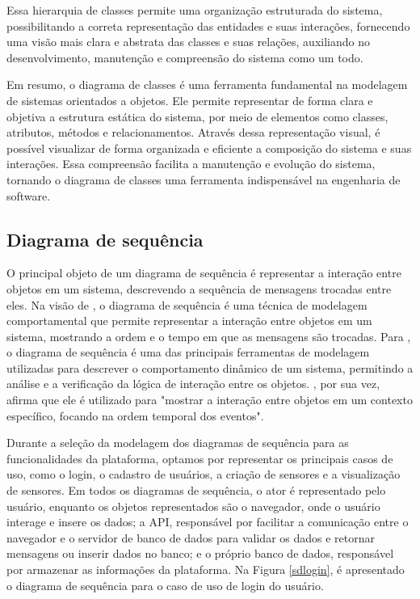 \documentclass[tcc,capa]{texufpel}
\begin{document}
Essa hierarquia de classes permite uma organização estruturada do sistema, possibilitando a correta representação das entidades e suas interações, fornecendo uma visão mais clara e abstrata das classes e suas relações, auxiliando no desenvolvimento, manutenção e compreensão do sistema como um todo.

Em resumo, o diagrama de classes é uma ferramenta fundamental na modelagem de sistemas orientados a objetos. Ele permite representar de forma clara e objetiva a estrutura estática do sistema, por meio de elementos como classes, atributos, métodos e relacionamentos. Através dessa representação visual, é possível visualizar de forma organizada e eficiente a composição do sistema e suas interações. Essa compreensão facilita a manutenção e evolução do sistema, tornando o diagrama de classes uma ferramenta indispensável na engenharia de software.


\subsection{Diagrama de sequência}
O principal objeto de um diagrama de sequência é representar a interação entre objetos em um sistema, descrevendo a sequência de mensagens trocadas entre eles. Na visão de \citet{PRESSMAN:2016}, o diagrama de sequência é uma técnica de modelagem comportamental que permite representar a interação entre objetos em um sistema, mostrando a ordem e o tempo em que as mensagens são trocadas. Para \citet{SOMMERVILLE:2011}, o diagrama de sequência é uma das principais ferramentas de modelagem utilizadas para descrever o comportamento dinâmico de um sistema, permitindo a análise e a verificação da lógica de interação entre os objetos. \citet{LARMAN:2011}, por sua vez, afirma que ele é utilizado para "mostrar a interação entre objetos em um contexto específico, focando na ordem temporal dos eventos".

Durante a seleção da modelagem dos diagramas de sequência para as funcionalidades da plataforma, optamos por representar os principais casos de uso, como o login, o cadastro de usuários, a criação de sensores e a visualização de sensores. Em todos os diagramas de sequência, o ator é representado pelo usuário, enquanto os objetos representados são o navegador, onde o usuário interage e insere os dados; a API, responsável por facilitar a comunicação entre o navegador e o servidor de banco de dados para validar os dados e retornar mensagens ou inserir dados no banco; e o próprio banco de dados, responsável por armazenar as informações da plataforma. Na Figura \ref{sdlogin}, é apresentado o diagrama de sequência para o caso de uso de login do usuário.
\end{document}

